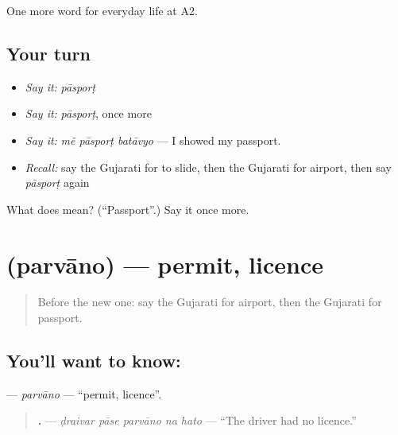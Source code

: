 \begin{grammarlens}[title={What you've built}]
One more word for everyday life at A2.
\end{grammarlens}

\subsection*{Your turn}
\begin{itemize}
\raggedright
  \item \emph{Say it:} \emph{pāsporṭ}
  \item \emph{Say it:} \emph{pāsporṭ}, once more
  \item \emph{Say it:} \emph{mẽ pāsporṭ batāvyo} — I showed my passport.
  \item \emph{Recall:} say the Gujarati for to slide, then the Gujarati for airport, then say \emph{pāsporṭ} again
\end{itemize}

\begin{tcolorbox}[breakable,colback=teal!4,colframe=teal!35!black,title={Before you move on}]
What does  mean? (\textquotedblleft{}Passport\textquotedblright{}.) Say it once more.
\end{tcolorbox}
\section[\texorpdfstring{\gu{પરવાનો} (parvāno)}{પરવાનો (parvāno)}]{ (parvāno) — permit, licence}

\label{lesson:GU-C210-parvano}



\begin{quote}
Before the new one: say the Gujarati for airport, then the Gujarati for passport.
\end{quote}

\subsection*{You'll want to know: }
\textbf{} — \emph{parvāno} — \textquotedblleft{}permit, licence\textquotedblright{}.

\begin{quote}
\textbf{    .} — \emph{ḍraivar pāse parvāno na hato} — \textquotedblleft{}The driver had no licence.\textquotedblright{}
\end{quote}

